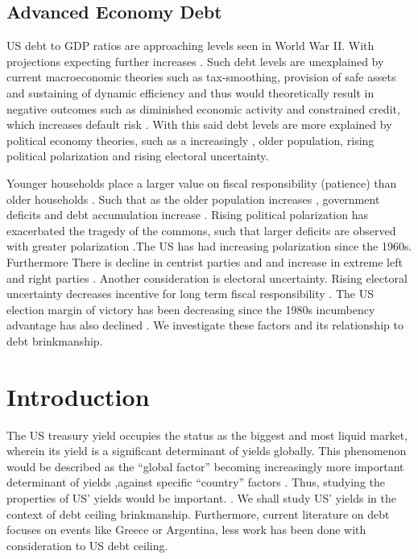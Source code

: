 \documentclass[
  12pt]{article}
\begin{document}
\hypertarget{advanced-economy-debt}{%
\subsection{Advanced Economy Debt}\label{advanced-economy-debt}}

US debt to GDP ratios are approaching levels seen in World War II. With
projections expecting further increases
\citep{congressionalbudgetoffice2023}. Such debt levels are unexplained
by current macroeconomic theories such as tax-smoothing, provision of
safe assets and sustaining of dynamic efficiency and thus would
theoretically result in negative outcomes such as diminished economic
activity and constrained credit, which increases default risk
\citep{yared2019, battaglini2016, romer2018, obstfeld}. With this said
debt levels are more explained by political economy theories, such as a
increasingly , older population, rising political polarization and
rising electoral uncertainty.

Younger households place a larger value on fiscal responsibility
(patience) than older households \citep{wolter2013}. Such that as the
older population increases , government deficits and debt accumulation
increase
\citep{jackson2014, jackson2015, cukierman1989, tabellini1991, yared2019}.
Rising political polarization has exacerbated the tragedy of the
commons, such that larger deficits are observed with greater
polarization \citep{hertzberg2016}.The US has had increasing
polarization since the 1960s. Furthermore There is decline in centrist
parties and and increase in extreme left and right parties
\citep{funke2016, azzimonti2018}. Another consideration is electoral
uncertainty. Rising electoral uncertainty decreases incentive for long
term fiscal responsibility \citep{drazen2000, alt2006}. The US election
margin of victory has been decreasing since the 1980s incumbency
advantage has also declined \citep{jacobson2015}. We investigate these
factors and its relationship to debt brinkmanship.

\hypertarget{introduction}{%
\section{Introduction}\label{introduction}}

The US treasury yield occupies the status as the biggest and most liquid
market, wherein its yield is a significant determinant of yields
globally. This phenomenon would be described as the ``global factor''
becoming increasingly more important determinant of yields ,against
specific ``country'' factors \citep{mauro2002}. Thus, studying the
properties of US' yields would be important.
\citep{rozada2006, gonzález-rozada2008, longstaff2011}. We shall study
US' yields in the context of debt ceiling brinkmanship. Furthermore,
current literature on debt focuses on events like Greece or Argentina,
less work has been done with consideration to US debt ceiling.
\end{document}
